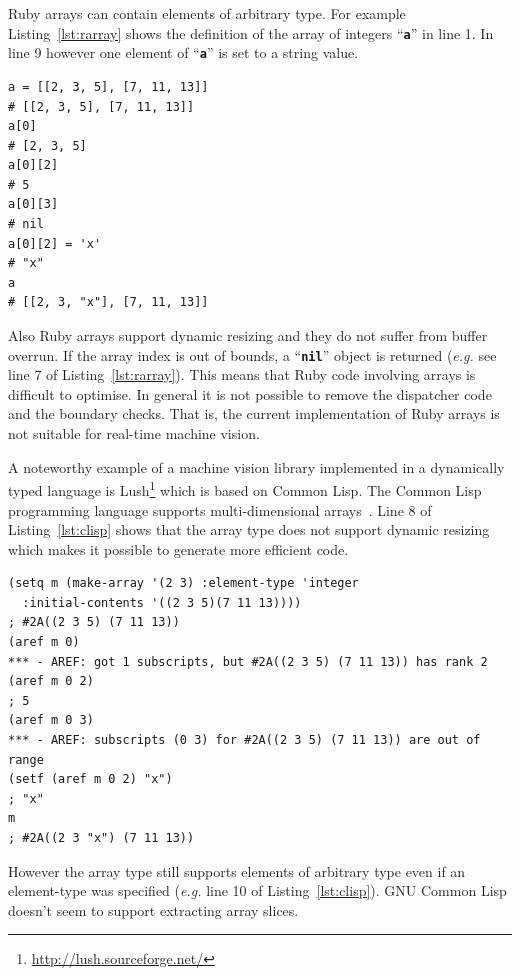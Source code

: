 \documentclass[12pt,a4paper,oneside,openright]{book}
\newcommand{\eg}{\emph{e.g.} }
\newcommand{\Eg}{For example }
\newcommand{\Ie}{That is, }
\newcommand{\lst}[1]{Listing~\ref{lst:#1}}
\newcommand{\code}[1]{``\texttt{\textbf{\textcolor{codegray}{\small{#1}}}}''}
\newcommand{\rubyout}{Comment lines (preceded with ``\#'') show the output of the program}
\newcommand{\lispout}{Comment lines (preceded with ``;'') show the output of the program}
\begin{document}
\begin{CJK}{UTF8}{}
Ruby arrays can contain elements of arbitrary type. \Eg \lst{rarray} shows the definition of the array of integers \code{a} in line 1. In line 9 however one element of \code{a} is set to a string value.
\lstset{language=Ruby,frame=single,numbers=left}
\begin{lstlisting}[float=htbp,caption={Arrays in Ruby. \rubyout},label=lst:rarray]
a = [[2, 3, 5], [7, 11, 13]]
# [[2, 3, 5], [7, 11, 13]]
a[0]
# [2, 3, 5]
a[0][2]
# 5
a[0][3]
# nil
a[0][2] = 'x'
# "x"
a
# [[2, 3, "x"], [7, 11, 13]]
\end{lstlisting}
Also Ruby arrays support dynamic resizing and they do not suffer from buffer overrun. If the array index is out of bounds, a \code{nil} object is returned (\eg see line 7 of \lst{rarray}). This means that Ruby code involving arrays is difficult to optimise. In general it is not possible to remove the dispatcher code and the boundary checks. \Ie the current implementation of Ruby arrays is not suitable for real-time machine vision.

A noteworthy example of a machine vision library implemented in a dynamically typed language is Lush\footnote{\url{http://lush.sourceforge.net/}} which is based on Common Lisp. The Common Lisp programming language supports multi-dimensional arrays~\citep{graham1994lisp}. Line 8 of \lst{clisp} shows that the array type does not support dynamic resizing which makes it possible to generate more efficient code.
\lstset{language=Lisp,frame=single,numbers=left}
\begin{lstlisting}[float=htbp,caption={Arrays in \acs{GNU} Common Lisp. \lispout},label=lst:clisp]
(setq m (make-array '(2 3) :element-type 'integer
  :initial-contents '((2 3 5)(7 11 13))))
; #2A((2 3 5) (7 11 13))
(aref m 0)
*** - AREF: got 1 subscripts, but #2A((2 3 5) (7 11 13)) has rank 2
(aref m 0 2)
; 5
(aref m 0 3)
*** - AREF: subscripts (0 3) for #2A((2 3 5) (7 11 13)) are out of range
(setf (aref m 0 2) "x")
; "x"
m
; #2A((2 3 "x") (7 11 13))
\end{lstlisting}
However the array type still supports elements of arbitrary type even if an element-type was specified (\eg line 10 of \lst{clisp}). \acs{GNU} Common Lisp doesn't seem to support extracting array slices.


\end{CJK}
\end{document}
